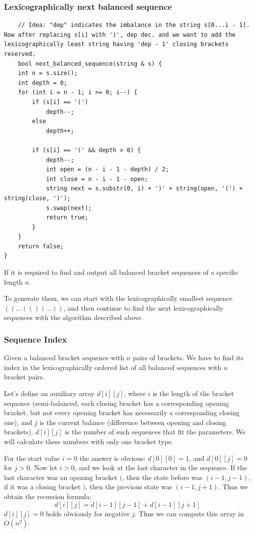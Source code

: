 \documentclass[8pt, a4paper, oneside, twocolumn]{extarticle}
\begin{document}
\subsubsection{Lexicographically next balanced sequence}
\begin{verbatim}
	// Idea: "dep" indicates the imbalance in the string s[0...i - 1]. Now after replacing s[i] with ')', dep dec. and we want to add the lexicographically least string having 'dep - 1' closing brackets reserved.
	bool next_balanced_sequence(string & s) {
    int n = s.size();
    int depth = 0;
    for (int i = n - 1; i >= 0; i--) {
        if (s[i] == '(')
            depth--;
        else
            depth++;

        if (s[i] == '(' && depth > 0) {
            depth--;
            int open = (n - i - 1 - depth) / 2;
            int close = n - i - 1 - open;
            string next = s.substr(0, i) + ')' + string(open, '(') + string(close, ')');
            s.swap(next);
            return true;
        }
    }
    return false;
}
\end{verbatim}
If it is required to find and output all balanced bracket sequences of a specific length $n$.

To generate them, we can start with the lexicographically smallest sequence $((\dots(())\dots))$, and then continue to find the next lexicographically sequences with the algorithm described above. 
\subsubsection{Sequence Index}
Given a balanced bracket sequence with $n$ pairs of brackets. We have to find its index in the lexicographically ordered list of all balanced sequences with $n$ bracket pairs.

Let's define an auxiliary array $d[i][j]$, where $i$ is the length of the bracket sequence (semi-balanced, each closing bracket has a corresponding opening bracket, but not every opening bracket has necessarily a corresponding closing one), and $j$ is the current balance (difference between opening and closing brackets). $d[i][j]$ is the number of such sequences that fit the parameters. We will calculate these numbers with only one bracket type.

For the start value $i = 0$ the answer is obvious: $d[0][0] = 1$, and $d[0][j] = 0$ for $j > 0$. Now let $i > 0$, and we look at the last character in the sequence. If the last character was an opening bracket $($, then the state before was $(i-1, j-1)$, if it was a closing bracket $)$, then the previous state was $(i-1, j+1)$. Thus we obtain the recursion formula: $$d[i][j] = d[i-1][j-1] + d[i-1][j+1]$$ $d[i][j] = 0$ holds obviously for negative $j$. Thus we can compute this array in $O(n^2)$.
\end{document}
